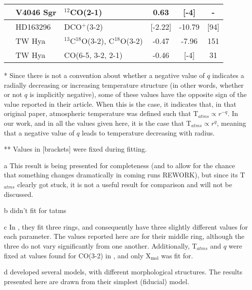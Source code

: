 \begin{table}[h!]
\begin{threeparttable}
\begin{tabular}{l l l c c c }
{{      \hline
      \citet{Rosenfeld2012}\tnote{b}        & V4046 Sgr  & $^{12}$CO(2-1) & 0.63 & [-4]           & -  \\
      \hline
      \citet{Flaherty2017}\tnote{c}         & HD163296   & DCO$^+$(3-2)   & [-2.22] & -10.79        & [94]  \\
      \hline
      \citet{Zhang2017}                     & TW Hya     & $^{13}$C$^{18}$O(3-2), C$^{18}$O(3-2)  & -0.47 & -7.96 & 151  \\
      \hline
      \citet{Flaherty2018}\tnote{d}         & TW Hya     & CO(6-5, 3-2, 2-1) & -0.46 & [-4]       & 31  \\
      \bottomrule
    \end{tabular}
    \begin{tablenotes}\footnotesize
      \item[*] Since there is not a convention about whether a negative value of $q$ indicates a radially decreasing or increasing temperature structure (in other words, whether or not $q$ is implicitly negative), some of these values have the opposite sign of the value reported in their article. When this is the case, it indicates that, in that original paper, atmospheric temperature was defined such that T$_{atms} \propto r^{-q}$. In our work, and in all the values given here, it is the case that T$_{atms} \propto r^{q}$, meaning that a negative value of $q$ leads to temperature decreasing with radius.
      \item[**] Values in [brackets] were fixed during fitting.
      \item[a] This result is being presented for completeness (and to allow for the chance that something changes dramatically in coming runs REWORK), but since its T$_{atms}$ clearly got stuck, it is not a useful result for comparison and will not be discussed.
      \item[b] \cite{Rosenfeld2012} didn't fit for tatms
      \item[c] In \citet{Flaherty2017}, they fit three rings, and consequently have three slightly different values for each parameter. The values reported here are for their middle ring, although the three do not vary significantly from one another. Additionally, T$_{atms}$ and $q$ were fixed at values found for CO(3-2) in \citet{Flaherty2015}, and only X$_\text{mol}$ was fit for.
      \item[d] \citet{Flaherty2018} developed several models, with different morphological structures. The results presented here are drawn from their simplest (fiducial) model.
    \end{tablenotes}
  \end{threeparttable}
\end{table}


